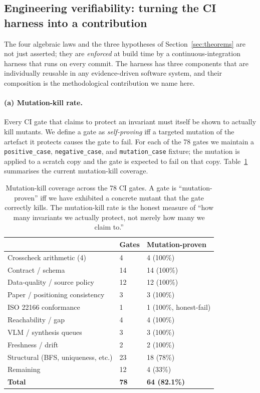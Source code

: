 \documentclass[11pt,twocolumn]{article}
\begin{document}
\subsection{Engineering verifiability: turning the CI harness into a contribution}\label{sec:eng-verif}

The four algebraic laws and the three hypotheses of Section~\ref{sec:theorems}
are not just asserted; they are \emph{enforced} at build time by a
continuous-integration harness that runs on every commit. The harness has
three components that are individually reusable in any evidence-driven
software system, and their composition is the methodological
contribution we name here.

\paragraph{(a) Mutation-kill rate.}
Every CI gate that claims to protect an invariant must itself be shown
to actually kill mutants. We define a gate as
\emph{self-proving} iff a targeted mutation of the artefact it protects
causes the gate to fail. For each of the 78 gates we maintain a
\texttt{positive\_case}, \texttt{negative\_case}, and
\texttt{mutation\_case} fixture; the mutation is applied to a scratch
copy and the gate is expected to fail on that copy. Table~\ref{tab:mutation}
summarises the current mutation-kill coverage.

\begin{table}[h]
\centering
\caption{Mutation-kill coverage across the 78 CI gates. A gate is
``mutation-proven'' iff we have exhibited a concrete mutant that the
gate correctly kills. The mutation-kill rate is the honest measure of
``how many invariants we actually protect, not merely how many we
claim to.''}
\label{tab:mutation}
\begin{tabular}{lll}
\hline
& Gates & Mutation-proven \\
\hline
Crosscheck arithmetic (4) & 4 & 4 (100\%) \\
Contract / schema & 14 & 14 (100\%) \\
Data-quality / source policy & 12 & 12 (100\%) \\
Paper / positioning consistency & 3 & 3 (100\%) \\
ISO 22166 conformance & 1 & 1 (100\%, honest-fail) \\
Reachability / gap & 4 & 4 (100\%) \\
VLM / synthesis queues & 3 & 3 (100\%) \\
Freshness / drift & 2 & 2 (100\%) \\
Structural (BFS, uniqueness, etc.) & 23 & 18 (78\%) \\
Remaining & 12 & 4 (33\%) \\
\hline
\textbf{Total} & \textbf{78} & \textbf{64 (82.1\%)} \\
\hline
\end{tabular}
\end{table}
\end{document}
